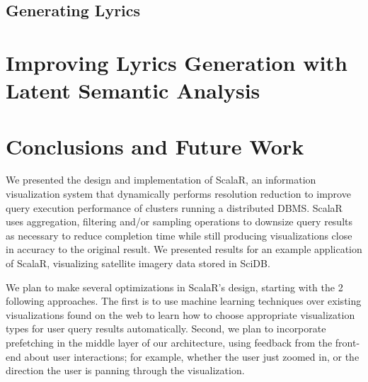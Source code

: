 \documentclass{vgtc}                          %
\begin{document}
\subsection{Generating Lyrics}


\section{Improving Lyrics Generation with Latent Semantic Analysis}

\section{Conclusions and Future Work}

We presented the design and implementation of ScalaR, an information visualization
system that dynamically performs resolution reduction to improve query execution
performance of clusters running a distributed DBMS.
 ScalaR uses aggregation, filtering and/or sampling operations to downsize query
results
as necessary to reduce
completion time while still producing visualizations close in accuracy
to the original result.
We presented
results for an example application of ScalaR, visualizing satellite imagery data stored in
SciDB.

We plan to make several optimizations in ScalaR's design, starting with the
2 following approaches.
The first is to use machine learning techniques over existing visualizations found
on the web to learn how to choose appropriate visualization types for user query
results automatically.
Second, we plan to
incorporate prefetching in the middle layer of our architecture, using feedback
from the front-end about user interactions; for example, whether the user just
zoomed in, or the direction the user is panning
through the visualization.

%


\end{document}
